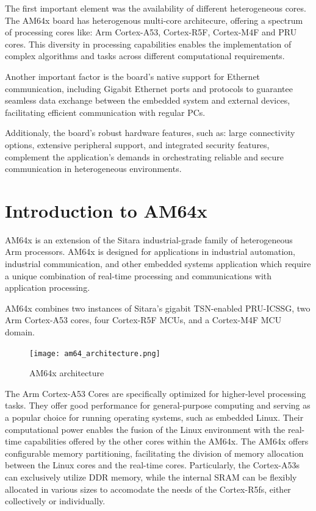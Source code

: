 The first important element was the availability of different heterogeneous
cores. The AM64x board has heterogenous multi-core architecure, offering a
spectrum of processing cores like: Arm Cortex-A53, Cortex-R5F, Cortex-M4F and
PRU cores. This diversity in processing capabilities enables the implementation
of complex algorithms and tasks across different computational requirements.

Another important factor is the board's native support for Ethernet
communication, including Gigabit Ethernet ports and protocols to guarantee 
seamless data exchange between the embedded system and external devices,
facilitating efficient communication with regular PCs.

Additionaly, the board's robust hardware features, such as: large connectivity
options, extensive peripheral support, and integrated security features,
complement the application's demands in orchestrating reliable and secure
communication in heterogeneous environments.

\section{Introduction to AM64x}

AM64x is an extension of the Sitara industrial-grade family of heterogeneous
Arm processors. \cite{AM64_datasheet}
AM64x is designed for applications in industrial automation, industrial
communication, and other embedded systems application which require a unique
combination of real-time processing and communications with application
processing. 

AM64x combines two instances of Sitara's gigabit TSN-enabled PRU-ICSSG,
two Arm Cortex-A53 cores, four Cortex-R5F MCUs, and a Cortex-M4F MCU
domain.

\begin{figure}[htb]
    \centering
    \texttt{[image: am64\_architecture.png]}
    \caption{AM64x architecture}
\end{figure}

The Arm Cortex-A53 Cores are specifically optimized for higher-level
processing tasks.
They offer good performance for general-purpose computing and serving as a
popular choice for running operating systems, such as embedded Linux.
Their computational power enables the fusion of the Linux environment with the
real-time capabilities offered by the other cores within the AM64x.
The AM64x offers configurable memory partitioning, facilitating the division
of memory allocation between the Linux cores and the real-time cores.
Particularly, the Cortex-A53s can exclusively utilize DDR memory, while 
the internal SRAM can be flexibly allocated in various sizes to accomodate
the needs of the Cortex-R5fs, either collectively or individually.

